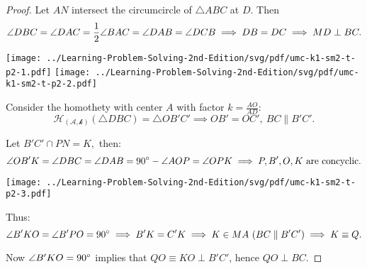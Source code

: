 \documentclass{article}
\begin{document}
\begin{proof}
    Let $AN$ intersect the circumcircle of $\triangle ABC$ at $D$. Then 
    \[
        \angle DBC = \angle DAC = \frac{1}{2} \angle BAC = \angle DAB = \angle DCB
        \implies DB = DC \implies MD \perp BC.
    \]
    \begin{center}
        \texttt{[image: ../Learning-Problem-Solving-2nd-Edition/svg/pdf/umc-k1-sm2-t-p2-1.pdf]}
        \quad
        \texttt{[image: ../Learning-Problem-Solving-2nd-Edition/svg/pdf/umc-k1-sm2-t-p2-2.pdf]}
    \end{center}

    Consider the homothety with center $A$ with factor $k=\frac{AO}{AD}$:
    \[
        \mathcal{H_{(A, k)}}(\triangle DBC) = \triangle OB'C' \implies OB' = OC',\ BC \parallel B'C'.
    \]

    Let $B'C' \cap PN = K,$ then:
    \[
        \angle OB'K = \angle DBC = \angle DAB = 90^\circ - \angle AOP = \angle OPK \implies P, B', O, K\ \text{are concyclic}.
    \]
    \begin{center}
        \texttt{[image: ../Learning-Problem-Solving-2nd-Edition/svg/pdf/umc-k1-sm2-t-p2-3.pdf]}
    \end{center}

    Thus:
    \[
        \angle B'KO = \angle B'PO = 90^\circ \implies B'K = C'K \implies K \in MA\ (BC \parallel B'C') \implies K \equiv Q.
    \]

    Now $\angle B'KO = 90^\circ$ implies that $QO \equiv KO \perp B'C'$, hence $QO \perp BC$. 
\end{proof}
\end{document}
